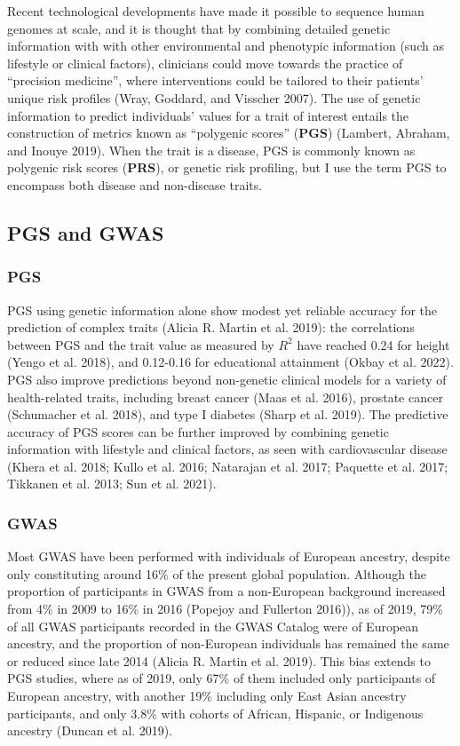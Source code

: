 \documentclass[
]{book}
\begin{document}
Recent technological developments have made it possible to sequence human genomes at scale, and it is thought that by combining detailed genetic information with with other environmental and phenotypic information (such as lifestyle or clinical factors), clinicians could move towards the practice of ``precision medicine'', where interventions could be tailored to their patients' unique risk profiles (Wray, Goddard, and Visscher 2007). The use of genetic information to predict individuals' values for a trait of interest entails the construction of metrics known as ``polygenic scores'' (\textbf{PGS}) (Lambert, Abraham, and Inouye 2019). When the trait is a disease, PGS is commonly known as polygenic risk scores (\textbf{PRS}), or genetic risk profiling, but I use the term PGS to encompass both disease and non-disease traits.

\hypertarget{pgs-and-gwas}{%
\subsection{PGS and GWAS}\label{pgs-and-gwas}}

\hypertarget{pgs}{%
\subsubsection{PGS}\label{pgs}}

PGS using genetic information alone show modest yet reliable accuracy for the prediction of complex traits (Alicia R. Martin et al. 2019): the correlations between PGS and the trait value as measured by \(R^2\) have reached 0.24 for height (Yengo et al. 2018), and 0.12-0.16 for educational attainment (Okbay et al. 2022). PGS also improve predictions beyond non-genetic clinical models for a variety of health-related traits, including breast cancer (Maas et al. 2016), prostate cancer (Schumacher et al. 2018), and type I diabetes (Sharp et al. 2019). The predictive accuracy of PGS scores can be further improved by combining genetic information with lifestyle and clinical factors, as seen with cardiovascular disease (Khera et al. 2018; Kullo et al. 2016; Natarajan et al. 2017; Paquette et al. 2017; Tikkanen et al. 2013; Sun et al. 2021).

\hypertarget{gwas}{%
\subsubsection{GWAS}\label{gwas}}

Most GWAS have been performed with individuals of European ancestry, despite only constituting around 16\% of the present global population. Although the proportion of participants in GWAS from a non-European background increased from 4\% in 2009 to 16\% in 2016 (Popejoy and Fullerton 2016)), as of 2019, 79\% of all GWAS participants recorded in the GWAS Catalog were of European ancestry, and the proportion of non-European individuals has remained the same or reduced since late 2014 (Alicia R. Martin et al. 2019). This bias extends to PGS studies, where as of 2019, only 67\% of them included only participants of European ancestry, with another 19\% including only East Asian ancestry participants, and only 3.8\% with cohorts of African, Hispanic, or Indigenous ancestry (Duncan et al. 2019).
\end{document}
